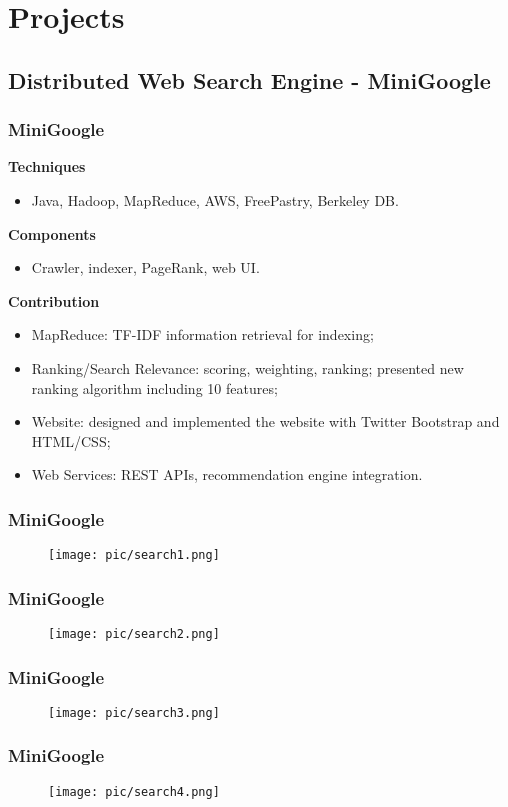 \documentclass{beamer}
\begin{document}

\section{Projects}


\subsection{Distributed Web Search Engine - MiniGoogle}

\begin{frame}

\frametitle{MiniGoogle}

\textbf{Techniques}
\begin{itemize} \item Java, Hadoop, MapReduce, AWS, FreePastry, Berkeley DB. \end{itemize}
\textbf{Components}
\begin{itemize} \item Crawler, indexer, PageRank, web UI. \end{itemize}
\textbf{Contribution}
\begin{itemize}
\item MapReduce: TF-IDF information retrieval for indexing;
\item Ranking/Search Relevance: scoring, weighting, ranking; presented new ranking algorithm including 10 features;
\item Website: designed and implemented the website with Twitter Bootstrap and HTML/CSS;
\item Web Services: REST APIs, recommendation engine integration.
\end{itemize}
\end{frame}


\begin{frame}
\frametitle{MiniGoogle}
\begin{figure}
\texttt{[image: pic/search1.png]}
\end{figure}
\end{frame}
\begin{frame}
\frametitle{MiniGoogle}
\begin{figure}
\texttt{[image: pic/search2.png]}
\end{figure}
\end{frame}
\begin{frame}
\frametitle{MiniGoogle}
\begin{figure}
\texttt{[image: pic/search3.png]}
\end{figure}
\end{frame}
\begin{frame}
\frametitle{MiniGoogle}
\begin{figure}
\texttt{[image: pic/search4.png]}
\end{figure}
\end{frame}
\end{document}
